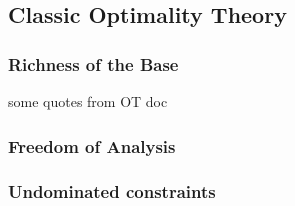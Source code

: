 \subsection{Classic Optimality Theory}


\subsubsection{Richness of the Base}

some quotes from OT doc
\citet{PE}
\citet{Bye2001}

\subsubsection{Freedom of Analysis}

\citet{Smolensky1996}
\citet{PE}

\subsubsection{Undominated constraints}


